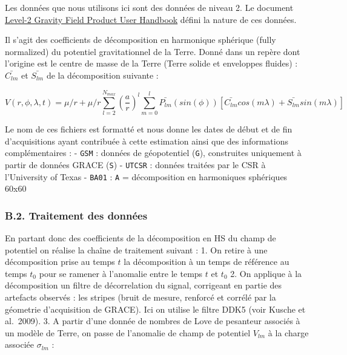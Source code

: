 \documentclass[11pt]{article}
\begin{document}
Les données que nous utilisons ici sont des données de niveau 2. Le
document
\href{https://deotb6e7tfubr.cloudfront.net/s3-edaf5da92e0ce48fb61175c28b67e95d/podaac-ops-cumulus-docs.s3.us-west-2.amazonaws.com/grace/open/docs/L2-UserHandbook_v4.0.pdf?A-userid=None\&Expires=1705442146\&Signature=D5r13RNRe2K7kD41UipU2D3H3iorLHsNGGlf3X9J0Net9lZNHZMgbMjAXj61-HX6mxplcg7Ti80bWRm2hhVj85uKJfh9n04r0OBkLrL6aWefiY2uiskhYwGib~Omxxw~uHY1A8nXvwDOFPJaPenbUO061zxoV~wJ2rAGEY69Fxr32mYBh4Vpje6~FuKJQ3SpsucqPcWqgVkQyhsxMgHeXVGZ3RPXkHM781Kq0Ncg-iSjp7hovK9tAiNIJkFjdHdnSDHaNU~P1FHhnZZDPxF4YxctMMZK91KDjo3nZ0T4rfosDa9Qg8DFVGOH8vTor0vwjHiMASvNAG1k9BBGKVJNZw__\&Key-Pair-Id=K3OEOUZXFQBEJ5}{Level-2
Gravity Field Product User Handbook} défini la nature de ces données.

Il s'agit des coefficients de décomposition en harmonique sphérique
(fully normalized) du potentiel gravitationnel de la Terre. Donné dans
un repère dont l'origine est le centre de masse de la Terre (Terre
solide et enveloppes fluides) : \(\bar{C_{lm}}\) et \(\bar{S_{lm}}\) de
la décomposition suivante :

\[
V(r,\phi,\lambda,t) = \mu/r + \mu/r\sum_{l=2}^{N_{max}}\left(\frac{a}{r}\right)^l\sum_{m=0}^l\bar{P_{lm}}(sin(\phi))\left[\bar{C_{lm}}cos(m\lambda)+\bar{S_{lm}}sin(m\lambda)\right]
\]

Le nom de ces fichiers est formatté et nous donne les dates de début et
de fin d'acquisitions ayant contribuée à cette estimation ainsi que des
informations complémentaires : - \texttt{GSM} : données de géopotentiel
(\texttt{G}), construites uniquement à partir de données GRACE
(\texttt{S}) - \texttt{UTCSR} : données traitées par le CSR à
l'University of Texas - \texttt{BA01} : \texttt{A} = décomposition en
harmoniques sphériques 60x60

\hypertarget{b.2.-traitement-des-donnuxe9es}{%
\subsubsection{B.2. Traitement des
données}\label{b.2.-traitement-des-donnuxe9es}}

En partant donc des coefficients de la décomposition en HS du champ de
potentiel on réalise la chaîne de traitement suivant : 1. On retire à
une décomposition prise au temps \(t\) la décomposition à un temps de
référence au temps \(t_0\) pour se ramener à l'anomalie entre le temps
\(t\) et \(t_0\) 2. On applique à la décomposition un filtre de
décorrelation du signal, corrigeant en partie des artefacts observés :
les stripes (bruit de mesure, renforcé et corrélé par la géometrie
d'acquisition de GRACE). Ici on utilise le filtre DDK5 (voir Kusche et
al.~2009). 3. A partir d'une donnée de nombres de Love de pesanteur
associés à un modèle de Terre, on passe de l'anomalie de champ de
potentiel \(V_{lm}\) à la charge associée \(\sigma_{lm}\) :
\end{document}
